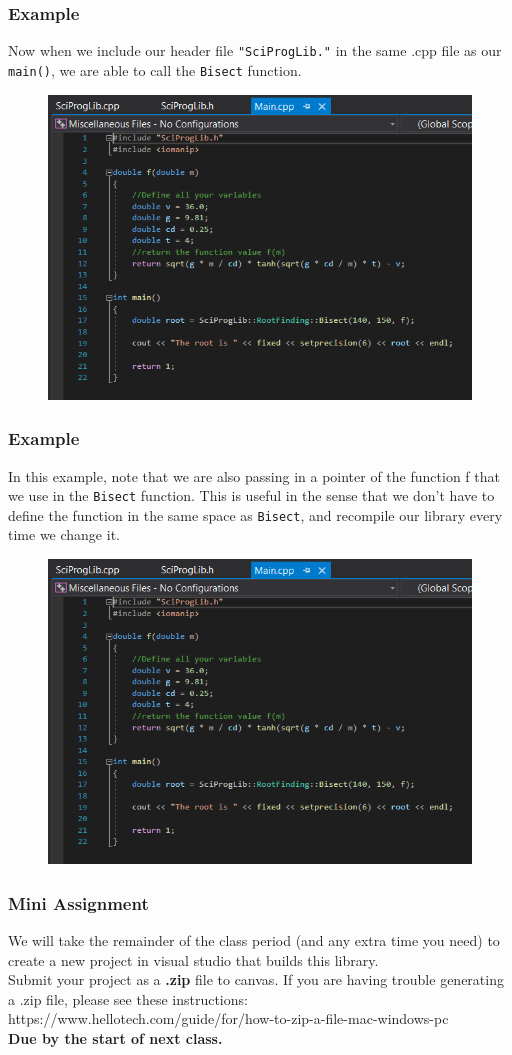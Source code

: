 \documentclass{if-beamer}
\begin{document}
\begin{frame}
	\frametitle{Example}
	Now when we include our header file \texttt{"SciProgLib."} in the same .cpp file as our \texttt{main()}, we are able to call the \texttt{Bisect} function.
		\begin{figure}
		\centering
		\includegraphics[width = .7\textwidth]{figures/main}
	\end{figure}
\end{frame}


\begin{frame}
	\frametitle{Example}
	In this example, note that we are also passing in a pointer of the function f that we use in the \texttt{Bisect} function. This is useful in the sense that we don't have to define the function in the same space as \texttt{Bisect}, and recompile our library every time we change it.
	\begin{figure}
		\centering
		\includegraphics[width = .7\textwidth]{figures/main}
	\end{figure}
\end{frame}

\begin{frame}
	\frametitle{Mini Assignment}
	We will take the remainder of the class period (and any extra time you need) to create a new project in visual studio that builds this library. 
	\\\vspace{0.5cm}
	Submit your project as a \textbf{.zip} file to canvas. If you are having trouble generating a .zip file, please see these instructions: \\ https://www.hellotech.com/guide/for/how-to-zip-a-file-mac-windows-pc \\\vspace{0.5cm}
	\textbf{Due by the start of next class.}
	
\end{frame}	
\end{document}
